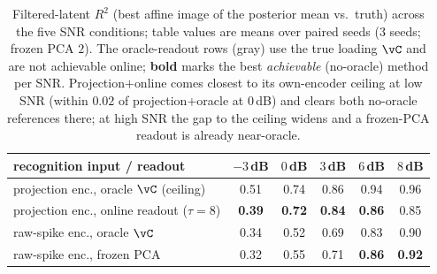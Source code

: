 \documentclass[11pt]{article}
\newcommand{\cgray}[1]{\textcolor{black!50}{#1}}
\begin{document}
\begin{table}[t]
\centering
\caption{Filtered-latent $R^2$ (best affine image of the posterior mean vs.\ truth) across the
five SNR conditions; table values are means over paired seeds ($3$ seeds; frozen PCA $2$). The
oracle-readout rows (\cgray{gray}) use the true loading $\vC$ and are not achievable online;
\textbf{bold} marks the best \emph{achievable} (no-oracle) method per SNR. Projection$+$online comes
closest to its own-encoder ceiling at low SNR (within
$0.02$ of projection$+$oracle at $0$\,dB) and clears both no-oracle references there; at high SNR
the gap to the ceiling widens and a frozen-PCA readout is already near-oracle.}
\label{tab:r2}
\begin{tabular}{lccccc}
\toprule
recognition input / readout & $-3$\,dB & $0$\,dB & $3$\,dB & $6$\,dB & $8$\,dB\\
\midrule
\cgray{projection enc., oracle $\vC$ (ceiling)}      & \cgray{0.51} & \cgray{0.74} & \cgray{0.86} & \cgray{0.94} & \cgray{0.96}\\
projection enc., online readout ($\tau{=}8$) & \textbf{0.39} & \textbf{0.72} & \textbf{0.84} & \textbf{0.86} & 0.85\\
\cgray{raw-spike enc., oracle $\vC$}          & \cgray{0.34} & \cgray{0.52} & \cgray{0.69} & \cgray{0.83} & \cgray{0.90}\\
raw-spike enc., frozen PCA                    & 0.32 & 0.55 & 0.71 & \textbf{0.86} & \textbf{0.92}\\
\bottomrule
\end{tabular}
\end{table}
\end{document}
